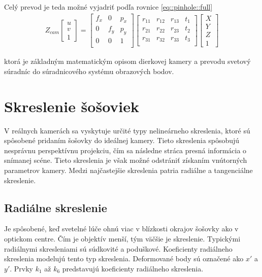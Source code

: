 Celý prevod je teda možné vyjadriť podľa rovnice \ref{eq::pinhole::full} 
\begin{equation}
\label{eq::pinhole::full}
\begin{aligned}
Z_{cam}
\begin{bmatrix}
u \\ v \\ 1
\end{bmatrix}
=
\begin{bmatrix}
f_x & 0 & p_x \\
0 & f_y & p_y \\
0 & 0 & 1 \\
\end{bmatrix}
\begin{bmatrix}
r_{11} & r_{12} & r_{13} & t_{1} \\
r_{21} & r_{22} & r_{23} & t_{2} \\
r_{31} & r_{32} & r_{33} & t_{3} \\
\end{bmatrix}
\begin{bmatrix}
X \\ Y \\ Z \\ 1
\end{bmatrix}
\end{aligned}
\end{equation}

ktorá je základným matematickým opisom dierkovej kamery a prevodu svetový súradníc do súradnicového systému obrazových bodov. 

\section{Skreslenie šošoviek}

V reálnych kamerách sa vyskytuje určité typy nelineárneho skreslenia, ktoré sú spôsobené pridaním šošovky do ideálnej kamery. Tieto skreslenia spôsobujú nesprávnu perspektívnu projekciu, čím sa následne stráca presná informácia o snímanej scéne. Tieto skreslenia je však možné odstrániť získaním vnútorných parametrov kamery. Medzi najčastejšie skreslenia patria radiálne a tangenciálne skreslenie. 

\subsection{Radiálne skreslenie}
Je spôsobené, keď svetelné lúče ohnú viac v blízkosti okrajov šošovky ako v optickom centre. Čím je objektív menší, tým väčšie je skreslenie. Typickými radiálnymi skresleniami sú súdkovité a poduškové. Koeficienty radiálneho skreslenia modelujú tento typ skreslenia. Deformované body sú označené ako $x'$ a $y'$. Prvky $k_1$ až $k_6$ predstavujú koeficienty radiálneho skreslenia. 

